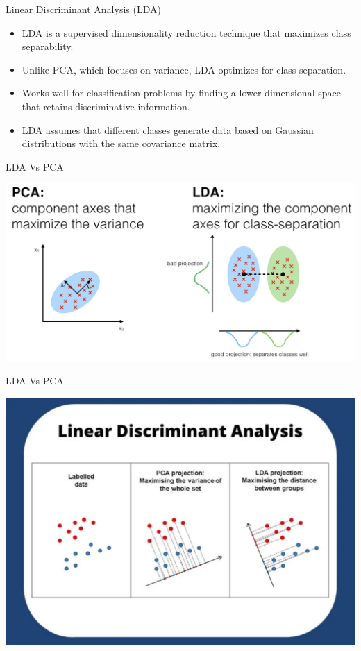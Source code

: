 \documentclass[11pt]{beamer}
\begin{document}
\begin{frame}{Linear Discriminant Analysis (LDA)}
    \begin{itemize}
        \item LDA is a supervised dimensionality reduction technique that maximizes class separability.
        \item Unlike PCA, which focuses on variance, LDA optimizes for class separation.
        \item Works well for classification problems by finding a lower-dimensional space that retains discriminative information.
        \item LDA assumes that different classes generate data based on Gaussian distributions with the same covariance matrix.
    \end{itemize}
\end{frame}
\begin{frame}{LDA Vs PCA}
	\begin{center}
	\includegraphics[scale=.375]{../05-pictures/lesson-2-2_pic_7.png}
	\end{center}
\end{frame}
\begin{frame}{LDA Vs PCA}
	\begin{center}
	\includegraphics[scale=.375]{../05-pictures/lesson-2-2_pic_8.png}
	\end{center}
\end{frame}
\end{document}
